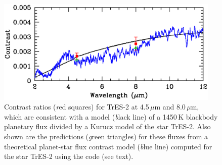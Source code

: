 \begin{figure}
\begin{center}
\includegraphics[width=0.95\textwidth]{6_f2}
\caption[%
Near-infrared contrast ratios for TrES-2]{%
Contrast ratios ({\textit red squares}) for TrES-2 at 4.5\,$\mu$m and 8.0\,$\mu$m, which are consistent with a model ({\textit black line}) of a 1450\,K blackbody planetary flux divided by a Kurucz model of the star TrES-2. Also shown are the predictions ({\textit green triangles}) for these fluxes from a theoretical planet-star flux contrast model ({\textit blue line}) computed for the star TrES-2 using the \citet{Seager_Richardson_Hansen:apj:2005a} code (see text).%
}\label{cha:spitzer:fig:tres2models}
\end{center}
\end{figure}

